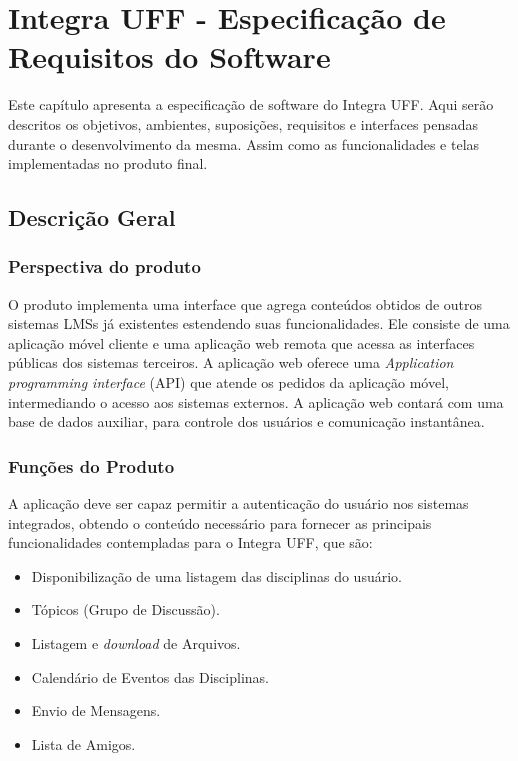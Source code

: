 \chapter{Integra UFF - Especificação de Requisitos do Software}
\thispagestyle{empty} %

Este capítulo apresenta a especificação de software do Integra UFF. Aqui serão descritos os objetivos, ambientes, suposições, requisitos e interfaces pensadas durante o desenvolvimento da mesma. Assim como as funcionalidades e telas implementadas no produto final. 

\section{Descrição Geral}

\subsection{Perspectiva do produto}

O produto implementa uma interface que agrega conteúdos obtidos de outros sistemas LMSs já existentes estendendo suas funcionalidades. Ele consiste de uma aplicação móvel cliente e uma aplicação web remota que acessa as interfaces públicas dos sistemas terceiros. A aplicação web oferece uma \textit{Application programming interface} (API) que atende os pedidos da aplicação móvel, intermediando o acesso aos sistemas externos.
A aplicação web contará com uma base de dados auxiliar, para controle dos usuários e comunicação instantânea.

\subsection{Funções do Produto}

A aplicação deve ser capaz permitir a autenticação do usuário nos sistemas integrados, obtendo o conteúdo necessário para fornecer as principais funcionalidades contempladas para o Integra UFF, que são:

\begin{itemize}
    \item Disponibilização de uma listagem das disciplinas do usuário.
    \item Tópicos (Grupo de Discussão).
    \item Listagem e \textit{download} de Arquivos.
    \item Calendário de Eventos das Disciplinas.
    \item Envio de Mensagens.
    \item Lista de Amigos.
\end{itemize}

